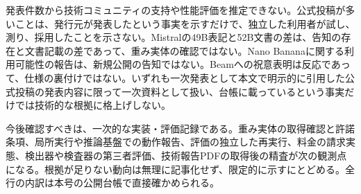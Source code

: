発表件数から技術コミュニティの支持や性能評価を推定できない。公式投稿が多いことは、発行元が発表したという事実を示すだけで、独立した利用者が試し、測り、採用したことを示さない。Mistralの49B表記と52B文書の差は、告知の存在と文書記載の差であって、重み実体の確認ではない\cite{mistral4}。Nano Bananaに関する利用可能性の報告は、新規公開の告知ではない\cite{nanobanana}。Beamへの祝意表明は反応であって、仕様の裏付けではない\cite{beam}。いずれも一次発表として本文で明示的に引用した公式投稿の発表内容に限って一次資料として扱い、台帳に載っているという事実だけでは技術的な根拠に格上げしない。

今後確認すべきは、一次的な実装・評価記録である。重み実体の取得確認と許諾条項、局所実行や推論基盤での動作報告、評価の独立した再実行、料金の請求実態、検出器や検査器の第三者評価、技術報告PDFの取得後の精査が次の観測点になる。根拠が足りない動向は無理に記事化せず、限定的に示すにとどめる。全行の内訳は本号の公開台帳で直接確かめられる。
